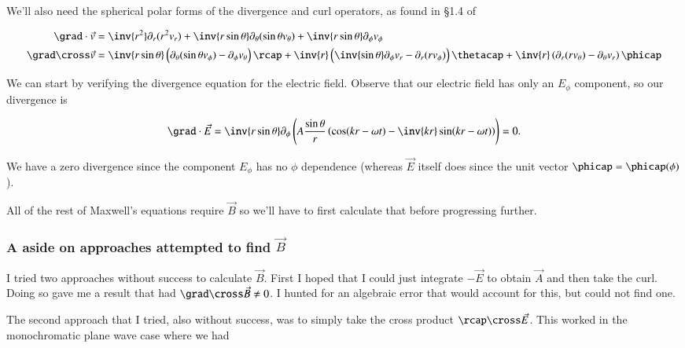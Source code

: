 We'll also need the spherical polar forms of the divergence and curl operators, as found in \S 1.4 of \cite{griffith1981introduction}

\begin{align}\label{eqn:relElectroDynProblemSet4:440}
\grad \cdot \vec{v} &=
\inv{r^2} \partial_r ( r^2 v_r )
+ \inv{r\sin\theta} \partial_\theta (\sin\theta v_\theta)
+ \inv{r\sin\theta} \partial_\phi v_\phi \\
\grad \cross \vec{v} &=
\inv{r \sin\theta} \left(
\partial_\theta (\sin\theta v_\phi) - \partial_\phi v_\theta
\right) \rcap
+
\inv{r } \left(
\inv{\sin\theta} \partial_\phi v_r - \partial_r (r v_\phi)
\right) \thetacap
+
\inv{r } \left(
\partial_r (r v_\theta) - \partial_\theta v_r
\right) \phicap
\end{align}

We can start by verifying the divergence equation for the electric field.  Observe that our electric field has only an $E_\phi$ component, so our divergence is

\begin{equation}\label{eqn:relElectroDynProblemSet4:460}
\grad \cdot \vec{E}
=
\inv{r\sin\theta} \partial_\phi \left(
A \frac{\sin\theta}{r} \left( \cos(k r - \omega t) - \inv{k r} \sin(k r - \omega t) \right) \right) = 0.
\end{equation}

We have a zero divergence since the component $E_\phi$ has no $\phi$ dependence (whereas $\vec{E}$ itself does since the unit vector $\phicap = \phicap(\phi)$).

All of the rest of Maxwell's equations require $\vec{B}$ so we'll have to first calculate that before progressing further.

\subsubsection{A aside on approaches attempted to find $\vec{B}$}

I tried two approaches without success to calculate $\vec{B}$.  First I hoped that I could just integrate $-\vec{E}$ to obtain $\vec{A}$ and then take the curl.  Doing so gave me a result that had $\grad \cross \vec{B} \ne 0$.  I hunted for an algebraic error that would account for this, but could not find one.

The second approach that I tried, also without success, was to simply take the cross product $\rcap \cross \vec{E}$.  This worked in the monochromatic plane wave case where we had

